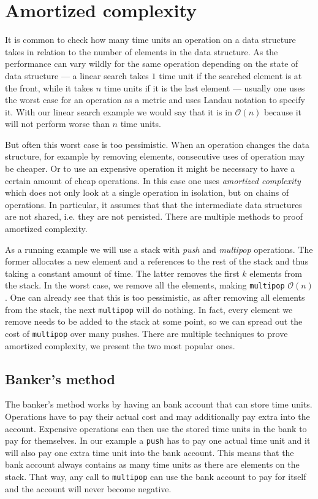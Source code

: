 \documentclass[sigplan,screen]{acmart}
\renewcommand\O[1]{$\mathcal{O}(#1)$}
\begin{document}
\section{Amortized complexity}\label{sec:complexity}

It is common to check how many time units an operation on a data structure takes in relation to the number of elements in the data structure. As the performance can vary wildly for the same operation depending on the state of data structure --- a linear search takes $1$ time unit if the searched element is at the front, while it takes $n$ time units if it is the last element --- usually one uses the worst case for an operation as a metric and uses Landau notation to specify it. With our linear search example we would say that it is in \O{n} because it will not perform worse than $n$ time units.

But often this worst case is too pessimistic. When an operation changes the data structure, for example by removing elements, consecutive uses of operation may be cheaper. Or to use an expensive operation it might be necessary to have a certain amount of cheap operations. In this case one uses \textit{amortized complexity} which does not only look at a single operation in isolation, but on chains of operations. In particular, it assumes that that the intermediate data structures are not shared, i.e. they are not persisted. There are multiple methods to proof amortized complexity.

As a running example we will use a stack with \textit{push} and \textit{multipop} operations. The former allocates a new element and a references to the rest of the stack and thus taking a constant amount of time. The latter removes the first $k$ elements from the stack. In the worst case, we remove all the elements, making \texttt{multipop} \O{n}. One can already see that this is too pessimistic, as after removing all elements from the stack, the next \texttt{multipop} will do nothing. In fact, every element we remove needs to be added to the stack at some point, so we can spread out the cost of \texttt{multipop} over many pushes. There are multiple techniques to prove amortized complexity, we present the two most popular ones.

\subsection{Banker's method}\label{sec:banker}

The banker's method works by having an bank account that can store time units. Operations have to pay their actual cost and may additionally pay extra into the account. Expensive operations can then use the stored time units in the bank to pay for themselves. In our example a \texttt{push} has to pay one actual time unit and it will also pay one extra time unit into the bank account. This means that the bank account always contains as many time units as there are elements on the stack. That way, any call to \texttt{multipop} can use the bank account to pay for itself and the account will never become negative.
\end{document}
